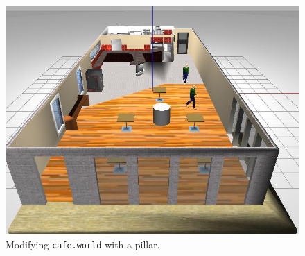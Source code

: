 \documentclass[12pt]{article}
\begin{document}
\begin{figure}[H]
  \centering\includegraphics[width=14cm]{lab1figure/mod_pillar.jpg}\vspace{-10pt}
  \caption{Modifying \texttt{cafe.world} with a pillar.}\label{fig:mod_pillar}
  \end{figure}
\end{document}
